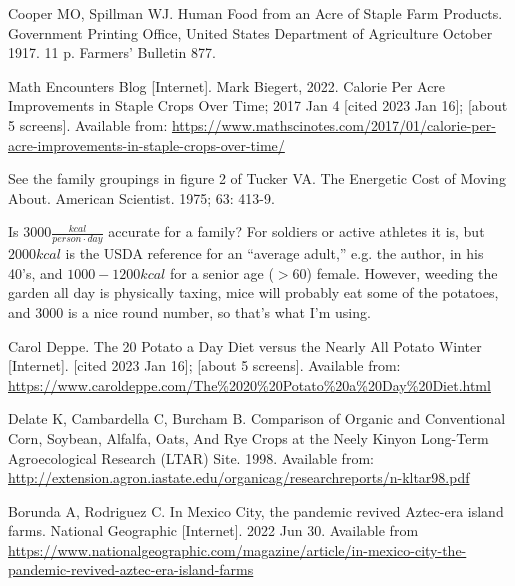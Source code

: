 \documentclass[12pt]{iopart}
\begin{document}
\begin{thebibliography}{99}
Cooper MO, Spillman WJ.
Human Food from an Acre of Staple Farm Products.
Government Printing Office, United States Department of Agriculture
October 1917.
11 p.
Farmers' Bulletin 877.



Math Encounters Blog [Internet].
Mark Biegert, 2022.
Calorie Per Acre Improvements in Staple Crops Over Time;
2017 Jan 4 [cited 2023 Jan 16]; [about 5 screens].
Available from: \url{https://www.mathscinotes.com/2017/01/calorie-per-acre-improvements-in-staple-crops-over-time/}



See the family groupings in figure 2 of 
Tucker VA.
The Energetic Cost of Moving About.
American Scientist.
1975; 63: 413-9.

Is $3000\frac{kcal}{person\cdot day}$ accurate for a family?  For soldiers or active athletes it is, but $2000kcal$ is the USDA reference for an ``average adult,'' e.g. the author, in his 40's, and   $1000-1200kcal$ for a senior age ($>60$) female.  However, weeding the garden all day is physically taxing, mice will probably eat some of the potatoes, and $3000$ is a nice round number, so that's what I'm using.

Carol Deppe.
The 20 Potato a Day Diet versus the Nearly All Potato Winter [Internet].
[cited 2023 Jan 16]; [about 5 screens].
Available from: 
\url{https://www.caroldeppe.com/The\%2020\%20Potato\%20a\%20Day\%20Diet.html}


Delate K, Cambardella C, Burcham B.
Comparison of Organic and Conventional Corn, 
Soybean, Alfalfa, Oats, And Rye Crops at the Neely Kinyon Long-Term Agroecological Research (LTAR) Site.
1998.
Available from: \url{http://extension.agron.iastate.edu/organicag/researchreports/n-kltar98.pdf} 

Borunda A, Rodriguez C.
In Mexico City, the pandemic revived Aztec-era island farms.
National Geographic [Internet].
2022 Jun 30.
Available from \url{https://www.nationalgeographic.com/magazine/article/in-mexico-city-the-pandemic-revived-aztec-era-island-farms}


\end{thebibliography}
\end{document}
